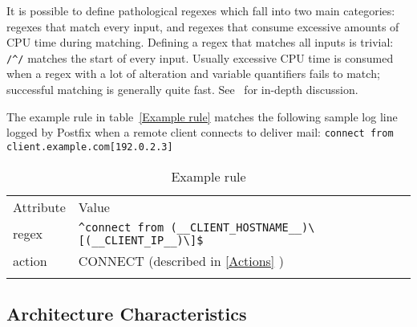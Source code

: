 \documentclass{svmult}
\newcommand{\tabletopline}[0]{%
    \hline%
    \noalign{\smallskip}%
}
\newcommand{\tablebottomline}[0]{%
    \noalign{\smallskip}%
    \hline%
}
\newcommand{\tablemiddleline}[0]{%
    \noalign{\smallskip}%
    \hline%
    \noalign{\smallskip}%
}
\newcommand{\sectionref}[1]{%
    \textsection{}\vref*{#1}%
}
\newcommand{\refwithlabel}[2]{%
    #1~\vref{#2}%
}
\newcommand{\tableref}[1]{%
    \refwithlabel{table}{#1}%
}
\newcommand{\tab}[0]{%
    \hspace*{2em}%
}
\begin{document}
It is possible to define pathological regexes which fall into two main
categories: regexes that match every input, and regexes that consume
excessive amounts of CPU time during matching.  Defining a regex that
matches all inputs is trivial: \verb!/^/! matches the start of every input.
Usually excessive CPU time is consumed when a regex with a lot of
alteration and variable quantifiers fails to match; successful matching is
generally quite fast.  See~\cite{mastering-regular-expressions} for
in-depth discussion.

The example rule in \tableref{Example rule} matches the following sample
log line logged by Postfix when a remote client connects to deliver mail:
\newline{}\tab{}\verb!connect from client.example.com[192.0.2.3]!

\begin{table}[htbp]
    \caption{Example rule}
    \empty{}\label{Example rule}
    \begin{tabular}[]{ll}
        \tabletopline{}%
        Attribute                 & Value                                                           \\
        \tablemiddleline{}%
        regex                     & \verb!^connect from (__CLIENT_HOSTNAME__)\[(__CLIENT_IP__)\]$!  \\
        action                    & CONNECT \hspace{3em}(described in \sectionref{Actions})         \\
        \tablebottomline{}%
    \end{tabular}
\end{table}

\subsection{Architecture Characteristics}

\label{Architecture characteristics}
\end{document}
